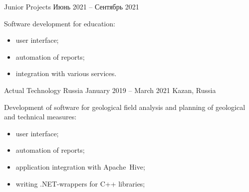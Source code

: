 \documentclass[10pt,a4paper,ragged2e,withhyper]{altacv}
\begin{document}

\makecvheader



\begin{paracol}{2}



{Junior Projects}
{Июнь 2021 -- Сентябрь 2021}

Software development for education:

\begin{itemize}

  \item user interface;
  \smallskip

  \item automation of reports;
  \smallskip

  \item integration with various services.

\end{itemize}

\divider

{Actual Technology Russia}
{January 2019 -- March 2021}
{Kazan, Russia}

Development of software for geological field analysis and planning of geological and technical measures:

\begin{itemize}

  \item user interface;
  \smallskip

  \item automation of reports;
  \smallskip

  \item application integration with Apache~Hive;
  \smallskip

  \item writing .NET-wrappers for C++ libraries;
  \smallskip


\end{itemize}
\end{paracol}
\end{document}
